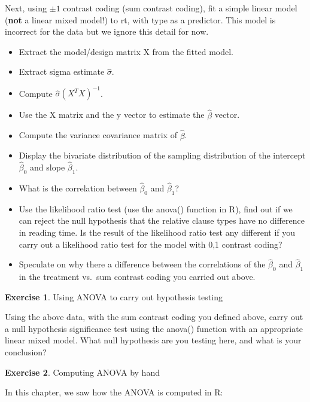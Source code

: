 \documentclass[
  12pt,
]{krantz}
\providecommand{\tightlist}{%
  \setlength{\itemsep}{0pt}\setlength{\parskip}{0pt}}
\theoremstyle{definition}
\theoremstyle{definition}
\theoremstyle{definition}
\newtheorem{exercise}{Exercise}[chapter]
\theoremstyle{definition}
\theoremstyle{remark}
\begin{document}
Next, using \(\pm 1\) contrast coding (sum contrast coding), fit a simple linear model (\textbf{not} a linear mixed model!) to rt, with type as a predictor. This model is incorrect for the data but we ignore this detail for now.

\begin{itemize}
\tightlist
\item
  Extract the model/design matrix X from the fitted model.
\item
  Extract sigma estimate \(\hat\sigma\).
\item
  Compute \(\hat\sigma (X^TX)^{-1}\).
\item
  Use the X matrix and the y vector to estimate the \(\hat\beta\) vector.
\item
  Compute the variance covariance matrix of \(\hat\beta\).
\item
  Display the bivariate distribution of the sampling distribution of the intercept \(\hat \beta_0\) and slope \(\hat\beta_1\).
\item
  What is the correlation between \(\hat \beta_0\) and \(\hat\beta_1\)?
\item
  Use the likelihood ratio test (use the anova() function in R), find out if we can reject the null hypothesis that the relative clause types have no difference in reading time. Is the result of the likelihood ratio test any different if you carry out a likelihood ratio test for the model with 0,1 contrast coding?
\item
  Speculate on why there a difference between the correlations of the \(\hat\beta_0\) and \(\hat\beta_1\) in the treatment vs.~sum contrast coding you carried out above.
\end{itemize}

\begin{exercise}
\protect\hypertarget{exr:LMManova}{}\label{exr:LMManova}Using ANOVA to carry out hypothesis testing
\end{exercise}

Using the above data, with the sum contrast coding you defined above, carry out a null hypothesis significance test using the anova() function with an appropriate linear mixed model. What null hypothesis are you testing here, and what is your conclusion?

\begin{exercise}
\protect\hypertarget{exr:anovabyhand}{}\label{exr:anovabyhand}Computing ANOVA by hand
\end{exercise}

In this chapter, we saw how the ANOVA is computed in R:
\end{document}
